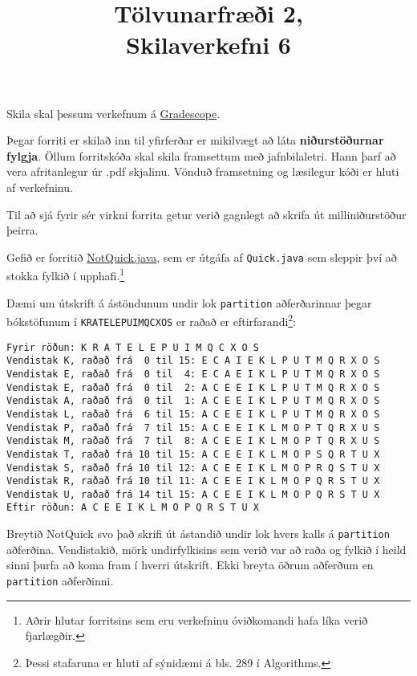 \documentclass{article}
\title{Tölvunarfræði 2, \semester \\ Skilaverkefni 6}
\author{}
\begin{document}
\maketitle
{}

Skila skal þessum verkefnum á \href{https://gradescope.com/courses/14122}{Gradescope}.

Þegar forriti er skilað inn til yfirferðar er mikilvægt að láta \textbf{niðurstöðurnar fylgja}. Öllum forritskóða skal skila framsettum með jafnbilaletri. Hann þarf að vera afritanlegur úr .pdf skjalinu. Vönduð framsetning og læsilegur kóði er hluti af verkefninu.

\question

Til að sjá fyrir sér virkni forrita getur verið gagnlegt að skrifa út milliniðurstöður þeirra.

Gefið er forritið \href{https://github.com/Ernir/kennsluefni/tree/master/T2/Code/w7/NotQuick.java}{NotQuick.java}, sem er útgáfa af \texttt{Quick.java} sem sleppir því að stokka fylkið í upphafi.\footnote{Aðrir hlutar forritsins sem eru verkefninu óviðkomandi hafa líka verið fjarlægðir.}

Dæmi um útskrift á ástöndunum undir lok \texttt{partition} aðferðarinnar þegar bókstöfunum í \texttt{KRATELEPUIMQCXOS} er raðað er eftirfarandi\footnote{Þessi stafaruna er hluti af sýnidæmi á bls. 289 í Algorithms.}:

\begin{verbatim}
Fyrir röðun: K R A T E L E P U I M Q C X O S 
Vendistak K, raðað frá  0 til 15: E C A I E K L P U T M Q R X O S 
Vendistak E, raðað frá  0 til  4: E C A E I K L P U T M Q R X O S 
Vendistak E, raðað frá  0 til  2: A C E E I K L P U T M Q R X O S 
Vendistak A, raðað frá  0 til  1: A C E E I K L P U T M Q R X O S 
Vendistak L, raðað frá  6 til 15: A C E E I K L P U T M Q R X O S 
Vendistak P, raðað frá  7 til 15: A C E E I K L M O P T Q R X U S 
Vendistak M, raðað frá  7 til  8: A C E E I K L M O P T Q R X U S 
Vendistak T, raðað frá 10 til 15: A C E E I K L M O P S Q R T U X 
Vendistak S, raðað frá 10 til 12: A C E E I K L M O P R Q S T U X 
Vendistak R, raðað frá 10 til 11: A C E E I K L M O P Q R S T U X 
Vendistak U, raðað frá 14 til 15: A C E E I K L M O P Q R S T U X 
Eftir röðun: A C E E I K L M O P Q R S T U X 
\end{verbatim}

Breytið NotQuick svo það skrifi út ástandið undir lok hvers kalls á \texttt{partition} aðferðina. Vendistakið, mörk undirfylkisins sem verið var að raða og fylkið í heild sinni þurfa að koma fram í hverri útskrift. Ekki breyta öðrum aðferðum en \texttt{partition} aðferðinni.
\end{document}

